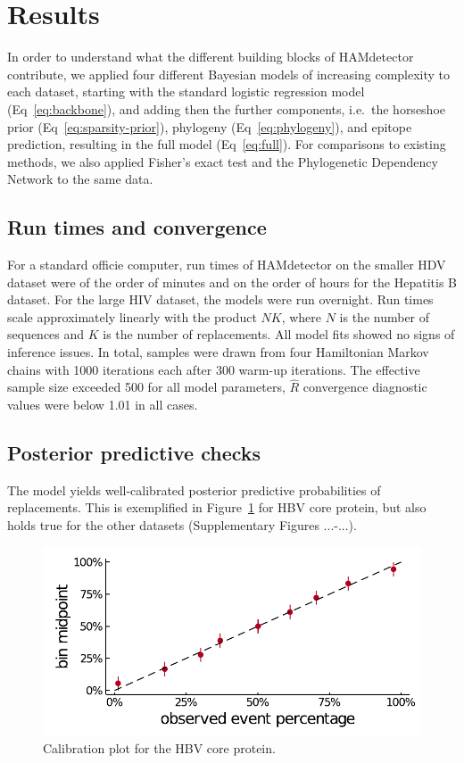 \documentclass{bioinfo}
\begin{document}
\section{Results} \label{sec:results}

In order to understand what the different building blocks of HAMdetector contribute, we applied four different Bayesian models of increasing complexity to each dataset, starting with the standard logistic regression model (Eq~\ref{eq:backbone}), and adding then the further components, i.e.\ the horseshoe prior (Eq~\ref{eq:sparsity-prior}), phylogeny (Eq~\ref{eq:phylogeny}), and epitope prediction, resulting in the full model (Eq~\ref{eq:full}). For comparisons to existing methods, we also applied Fisher's exact test and the Phylogenetic Dependency Network \cite{Carlson2008} to the same data.

\subsection{Run times and convergence}
For a standard officie computer, run times of HAMdetector on the smaller HDV dataset were of the order of minutes and on the order of hours for the Hepatitis B dataset. For the large HIV dataset, the models were run overnight. Run times scale approximately linearly with the product \(NK\), where \(N\) is the number of sequences and \(K\) is the number of replacements. All model fits showed no signs of inference issues. In total, samples were drawn from four Hamiltonian Markov chains with 1000 iterations each after 300 warm-up iterations. The effective sample size exceeded 500 for all model parameters, $\hat{R}$ convergence diagnostic values were below 1.01 in all cases.

\subsection{Posterior predictive checks}
The model yields well-calibrated posterior predictive probabilities of replacements. This is exemplified in Figure~\ref{fig:calibration} for HBV core protein, but also holds true for the other datasets (Supplementary Figures ...-...).

\begin{figure}
 \includegraphics[width=1.0\linewidth]{plots/phylogeny_calibration.pdf}  
  \caption{Calibration plot for the HBV core protein.}
  \label{fig:calibration}
\end{figure}
\end{document}
